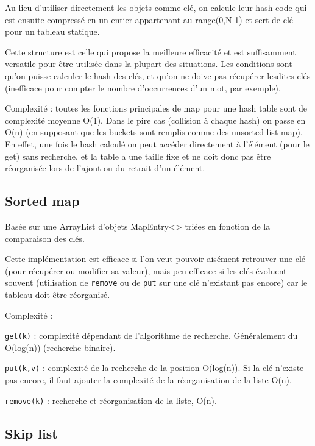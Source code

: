\documentclass[10pt,a4paper]{article}
\begin{document}
	Au lieu d'utiliser directement les objets comme clé, on calcule leur hash code qui est ensuite compressé en un entier appartenant au range(0,N-1) et sert de clé pour un tableau statique.
	
	Cette structure est celle qui propose la meilleure efficacité et est suffisamment versatile pour être utilisée dans la plupart des situations. Les conditions sont qu'on puisse calculer le hash des clés, et qu'on ne doive pas récupérer lesdites clés (inefficace pour compter le nombre d’occurrences d'un mot, par exemple).
	
	Complexité : toutes les fonctions principales de map pour une hash table sont de complexité moyenne O(1). Dans le pire cas (collision à chaque hash) on passe en O(n) (en supposant que les buckets sont remplis comme des unsorted list map).
	En effet, une fois le hash calculé on peut accéder directement à l'élément (pour le get) sans recherche, et la table a une taille fixe et ne doit donc pas être réorganisée lors de l'ajout ou du retrait d'un élément.
	

	\subsection*{Sorted map}
	
	Basée sur une ArrayList d'objets MapEntry<> triées en fonction de la comparaison des clés.
	
	Cette implémentation est efficace si l'on veut pouvoir aisément retrouver une clé (pour récupérer ou modifier sa valeur), mais peu efficace si les clés évoluent souvent (utilisation de \texttt{remove} ou de \texttt{put} sur une clé n'existant pas encore) car le tableau doit être réorganisé.
	
	\vspace{0.35cm}	
	
	Complexité :
	
	\texttt{get(k)} : complexité dépendant de l'algorithme de recherche. Généralement du O(log(n)) (recherche binaire).
	
	\texttt{put(k,v)} : complexité de la recherche de la position O(log(n)). Si la clé n'existe pas encore, il faut ajouter la complexité de la réorganisation de la liste O(n).
	
	\texttt{remove(k)} : recherche et réorganisation de la liste, O(n).


	\subsection*{Skip list}
	
\end{document}
